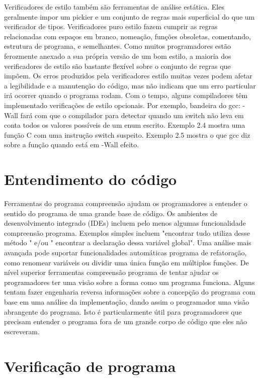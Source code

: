 	Verificadores de estilo também são ferramentas de análise estática. Eles geralmente impor um pickier e um conjunto de regras mais superficial do que um verificador de tipos. Verificadores puro estilo fazem cumprir as regras relacionadas com espaços em branco, nomeação, funções obsoletas, comentando, estrutura de programa, e semelhantes. Como muitos programadores estão ferozmente anexado a sua própria versão de um bom estilo, a maioria dos verificadores de estilo são bastante flexível sobre o conjunto de regras que impõem. Os erros produzidos pela verificadores estilo muitas vezes podem afetar a legibilidade e a manutenção do código, mas não indicam que um erro particular irá ocorrer quando o programa rodam. Com o tempo, alguns compiladores têm implementado verificações de estilo opcionais. Por exemplo, bandeira do gcc: -Wall fará com que o compilador para detectar quando um switch não leva em conta todos os valores possíveis de um enum escrito. Exemplo 2.4 mostra uma função C com uma instrução switch suspeito. Exemplo 2.5 mostra o que gcc diz sobre a função quando está em -Wall efeito.\\
	
	\section {Entendimento do código}
	
	Ferramentas do programa compreensão ajudam os programadores a entender o sentido  do programa de uma grande base de código. Os ambientes de desenvolvimento integrado (IDEs) incluem pelo menos algumas funcionalidade compreensão programa. Exemplos simples incluem "encontrar tudo utiliza desse método " e/ou " encontrar a declaração dessa variável global". Uma análise mais avançada pode suportar funcionalidades automáticas programa de refatoração, como renomear variáveis ou dividir uma única função em múltiplos funções. De nível superior ferramentas compreensão programa de tentar ajudar os programadores ter uma visão sobre a forma como um programa funciona. Alguns tentam fazer engenharia reversa informações sobre a concepção do programa com base em uma análise da implementação, dando assim o programador uma visão abrangente do programa. Isto é particularmente útil para programadores que precisam entender o programa fora de um grande corpo de código que eles não escreveram.\\
	
	\section {Verificação de programa}
	
